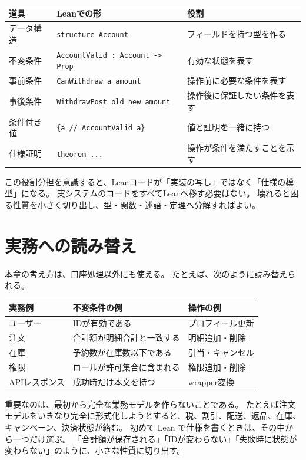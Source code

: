 \begin{center}
\begin{tabular}{lll}
\toprule
道具 & Leanでの形 & 役割 \\
\midrule
データ構造 & \texttt{structure Account} & フィールドを持つ型を作る \\
不変条件 & \texttt{AccountValid : Account -> Prop} & 有効な状態を表す \\
事前条件 & \texttt{CanWithdraw a amount} & 操作前に必要な条件を表す \\
事後条件 & \texttt{WithdrawPost old new amount} & 操作後に保証したい条件を表す \\
条件付き値 & \texttt{\{a // AccountValid a\}} & 値と証明を一緒に持つ \\
仕様証明 & \texttt{theorem ...} & 操作が条件を満たすことを示す \\
\bottomrule
\end{tabular}
\end{center}

この役割分担を意識すると、Leanコードが「実装の写し」ではなく「仕様の模型」になる。
実システムのコードをすべてLeanへ移す必要はない。
壊れると困る性質を小さく切り出し、型・関数・述語・定理へ分解すればよい。

\section{実務への読み替え}

本章の考え方は、口座処理以外にも使える。
たとえば、次のように読み替えられる。

\begin{center}
\begin{tabular}{lll}
\toprule
実務例 & 不変条件の例 & 操作の例 \\
\midrule
ユーザー & IDが有効である & プロフィール更新 \\
注文 & 合計額が明細合計と一致する & 明細追加・削除 \\
在庫 & 予約数が在庫数以下である & 引当・キャンセル \\
権限 & ロールが許可集合に含まれる & 権限追加・削除 \\
APIレスポンス & 成功時だけ本文を持つ & wrapper変換 \\
\bottomrule
\end{tabular}
\end{center}

重要なのは、最初から完全な業務モデルを作らないことである。
たとえば注文モデルをいきなり完全に形式化しようとすると、税、割引、配送、返品、在庫、キャンペーン、決済状態が絡む。
初めて Lean で仕様を書くときは、その中から一つだけ選ぶ。
「合計額が保存される」「IDが変わらない」「失敗時に状態が変わらない」のように、小さな性質に切り出す。

